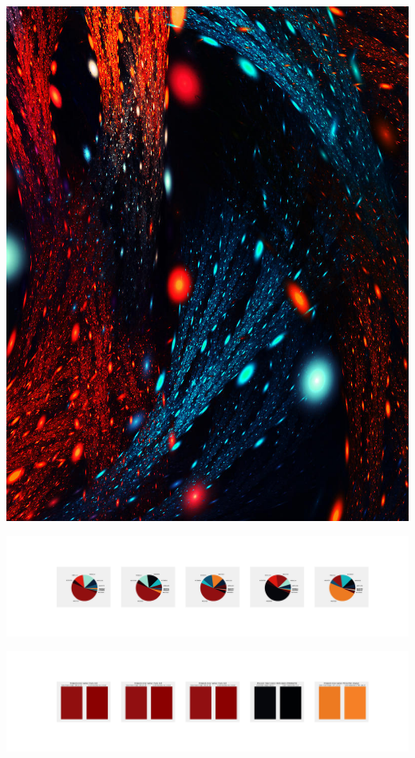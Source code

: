 \documentclass[11pt]{article}
\begin{document}
\begin{landscape}
    \begin{center}
    \includegraphics[width=\textwidth]{./nbimg/file (111).jpg}
    \end{center}

    \begin{center}
    \includegraphics[width=250mm]{./nbimg/pie-14.jpg}
    \end{center}

    \begin{center}
    \includegraphics[width=250mm]{./nbimg/peak-14.jpg}
    \end{center}
    


\end{landscape}
\end{document}
